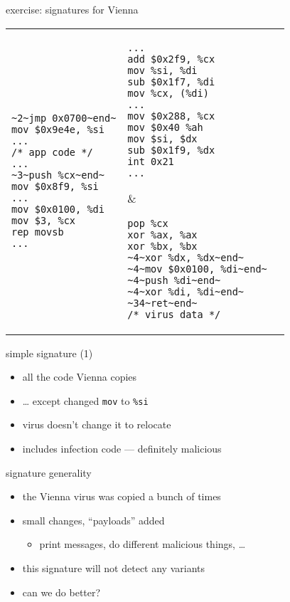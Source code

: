 
\begin{frame}[fragile,label=viennaSigs]{exercise: signatures for Vienna}
\begin{tabular}{lll}
\begin{lstlisting}
~2~jmp 0x0700~end~
mov $0x9e4e, %si
...
/* app code */
...
~3~push %cx~end~
mov $0x8f9, %si
...
mov $0x0100, %di
mov $3, %cx
rep movsb
...
\end{lstlisting}
&
\begin{lstlisting}
...
add $0x2f9, %cx
mov %si, %di
sub $0x1f7, %di
mov %cx, (%di)
...
mov $0x288, %cx
mov $0x40 %ah
mov $si, $dx
sub $0x1f9, %dx
int 0x21
...
\end{lstlisting}
&
\begin{lstlisting}
pop %cx
xor %ax, %ax
xor %bx, %bx
~4~xor %dx, %dx~end~
~4~mov $0x0100, %di~end~
~4~push %di~end~
~4~xor %di, %di~end~
~34~ret~end~
/* virus data */
\end{lstlisting}
\\
\end{tabular}
\end{frame}

\begin{frame}{simple signature (1)}
    \begin{itemize}
    \item all the code Vienna copies
    \item \ldots{} except changed {\tt mov} to {\tt \%si}
    \vspace{.5cm}
    \item virus doesn't change it to relocate
    \item includes infection code --- definitely malicious
    \end{itemize}
\end{frame}

\begin{frame}{signature generality}
    \begin{itemize}
    \item the Vienna virus was copied a bunch of times
    \item small changes, ``payloads'' added
        \begin{itemize}
        \item print messages, do different malicious things, \ldots
        \end{itemize}
    \item this signature will not detect any variants
    \item can we do better?
    \end{itemize}
\end{frame}

